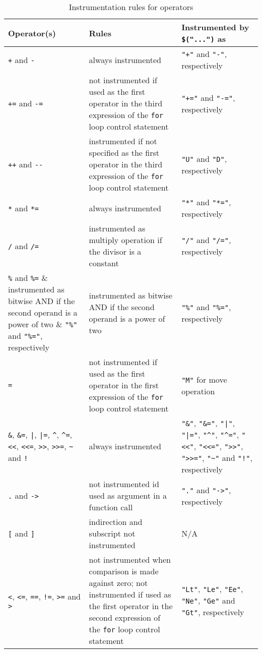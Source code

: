 \begin{table}[!hb]
\centering\small
\caption{Instrumentation rules for operators}
\begin{tabular}{|p{}<{\raggedright}|p{}<{\raggedright}|p{}<{\raggedright}|}
\hline
\textbf{Operator(s)} & \textbf{Rules} & \textbf{Instrumented by} \verb|$("...")| \textbf{as} \\
\hline
\verb|+| and \verb|-| & always instrumented & \verb|"+"| and \verb|"-"|, respectively \\
\hline
\verb|+=| and \verb|-=| & not instrumented if used as the first operator in the third expression of the \verb|for| loop control statement & \verb|"+="| and \verb|"-="|, respectively \\
\hline
\verb|++| and \verb|--| & instrumented if not specified as the first operator in the third expression of the \verb|for| loop control statement & \verb|"U"| and \verb|"D"|, respectively \\
\hline
\verb|*| and \verb|*=| & always instrumented & \verb|"*"| and \verb|"*="|, respectively \\
\hline
\verb|/| and \verb|/=| & instrumented as multiply operation if the divisor is a constant & \verb|"/"| and \verb|"/="|, respectively \\
\hline
\verb|%| and \verb|%=| & instrumented as bitwise AND if the second operand is a power of two & \verb|"%"| and \verb|"%="|, respectively \\
\hline
\verb|=| & not instrumented if used as the first operator in the first expression of the \verb|for| loop control statement & \verb|"M"| for move operation \\
\hline
\verb|&|, \verb|&=|, \verb$|$, \verb$|=$, \verb|^|, \verb|^=|, \verb|<<|, \verb|<<=|, \verb|>>|, \verb|>>=|, \verb|~| and \verb|!| & always instrumented & \verb|"&"|, \verb|"&="|, \verb$"|"$, \verb$"|="$, \verb|"^"|, \verb|"^="|, \verb|"<<"|, \verb|"<<="|, \verb|">>"|, \verb|">>="|, \verb|"~"| and \verb|"!"|, respectively \\
\hline
\verb|.| and \verb|->| & not instrumented id used as argument in a function call & \verb|"."| and \verb|"->"|, respectively \\
\hline
\verb|[| and \verb|]| & indirection and subscript not instrumented & N/A \\
\hline
\verb|<|, \verb|<=|, \verb|==|, \verb|!=|, \verb|>=| and \verb|>| & not instrumented when comparison is made against zero; not instrumented if used as the first operator in the second expression of the \verb|for| loop control statement & \verb|"Lt"|, \verb|"Le"|, \verb|"Ee"|, \verb|"Ne"|, \verb|"Ge"| and \verb|"Gt"|, respectively \\
\hline
\end{tabular}
\label{tab:instrumentation_rules_operators}
\end{table}

